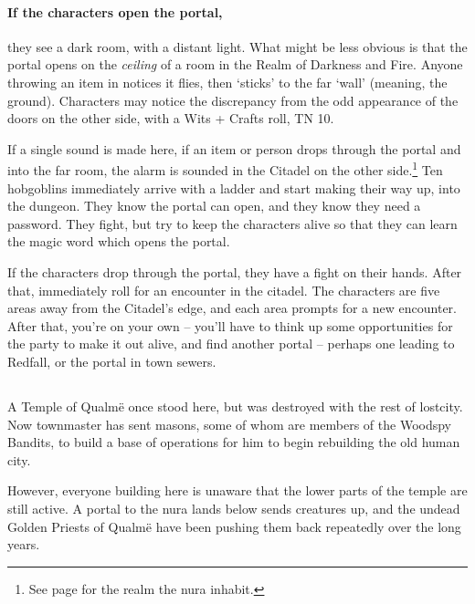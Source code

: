 \begin{multicols}{2}
\paragraph{If the characters open the portal,}
they see a dark room, with a distant light.
What might be less obvious is that the portal opens on the \emph{ceiling} of a room in the Realm of Darkness and Fire.
Anyone throwing an item in notices it flies, then `sticks' to the far `wall' (meaning, the ground).
Characters may notice the discrepancy from the odd appearance of the doors on the other side, with a Wits + Crafts roll, TN 10.

If a single sound is made here, if an item or person drops through the portal and into the far room, the alarm is sounded in the Citadel on the other side.\footnote{See page \pageref{darknessandfire} for the realm the nura inhabit.}
Ten hobgoblins immediately arrive with a ladder and start making their way up, into the dungeon.
They know the portal can open, and they know they need a password.
They fight, but try to keep the characters alive so that they can learn the magic word which opens the portal.

If the characters drop through the portal, they have a fight on their hands.
After that, immediately roll for an encounter in the citadel.
The characters are five areas away from the Citadel's edge, and each area prompts for a new encounter.
After that, you're on your own -- you'll have to think up some opportunities for the party to make it out alive, and find another portal -- perhaps one leading to Redfall, or the portal in \gls{town} sewers.

\subsection{}
\label{green_tower}
\setcounter{list}{0}


A Temple of Qualm\"{e} once stood here, but was destroyed with the rest of \gls{lostcity}.
Now \gls{townmaster} has sent masons, some of whom are members of the Woodspy Bandits, to build a base of operations for him to begin rebuilding the old human city.

However, everyone building here is unaware that the lower parts of the temple are still active.
A portal to the nura lands below sends creatures up, and the undead Golden Priests of Qualm\"{e} have been pushing them back repeatedly over the long years.


\end{multicols}
